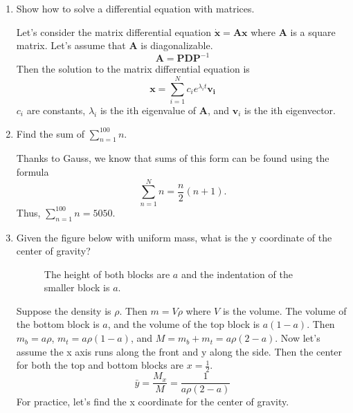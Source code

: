 \begin{enumerate}
  \begin{figure}[H]
    \centering
    
    \caption{Electrical diagram}
  \end{figure}
  For \(t > 0\),
  \[
  V = iR + \frac{1}{C}\int i(t) \ dt\eqnumtag\label{rccirc}
  \]
  where \(i(t) = \frac{dq}{dt}\).
  We can differeniate \cref{rccirc} to obatin
  \[
  0 = \dot{i}R + \frac{i}{C}.
  \]
  We can solve for current as a function of time now since
  \(Rm + \frac{1}{C} = 0\) so \(i(t) = Ae^{\frac{-t}{RC}}\).
  When \(t = 0\), \(i(0) = A = i_0\).
  Thus, \(i(t) = i_0e^{\frac{-t}{RC}}\).
\item
  Show how to solve a differential equation with matrices.
  \par\smallskip
  Let's consider the matrix differential equation
  \(\dot{\mathbf{x}} = \mathbf{A}\mathbf{x}\) where \(\mathbf{A}\) is a square
  matrix.
  Let's assume that \(\mathbf{A}\) is diagonalizable.
  \[
  \mathbf{A} = \mathbf{P}\mathbf{D}\mathbf{P}^{-1}
  \]
  Then the solution to the matrix differential equation is
  \[
  \mathbf{x} = \sum_{i = 1}^Nc_ie^{\lambda_it}\mathbf{v_i}
  \]
  \(c_i\) are constants, \(\lambda_i\) is the ith eigenvalue of \(\mathbf{A}\),
  and \(\mathbf{v}_i\) is the ith eigenvector.
\item
  Find the sum of \(\sum\limits_{n = 1}^{100}n\).
  \par\smallskip
  Thanks to Gauss, we know that sums of this form can be found using the formula
  \[
  \sum\limits_{n = 1}^Nn = \frac{n}{2}(n + 1).
  \]
  Thus, \(\sum\limits_{n = 1}^{100}n = 5050\).
\item
  Given the figure below with uniform mass, what is the y coordinate of the
  center of gravity?
  \begin{figure}[H]
    \centering
    
    \caption{The height of both blocks are \(a\) and the indentation of the
      smaller block is \(a\).}
  \end{figure}
  Suppose the density is \(\rho\).
  Then \(m = V\rho\) where \(V\) is the volume.
  The volume of the bottom block is \(a\), and the volume of the top block is
  \(a(1 - a)\).
  Then \(m_b = a\rho\), \(m_t = a\rho(1 - a)\), and
  \(M = m_b + m_t = a\rho(2 - a)\).
  Now let's assume the x axis runs along the front and y along the side.
  Then the center for both the top and bottom blocks are \(x = \frac{1}{2}\).
  \[
  \bar{y} = \frac{M_x}{M} = \frac{1}{a\rho(2 - a)}
  \]
  For practice, let's find the x coordinate for the center of gravity.

\end{enumerate}
